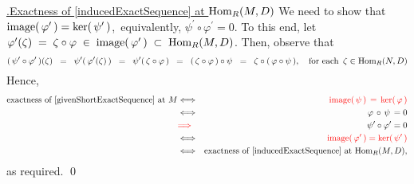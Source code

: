 \vskip 0.50cm
\noindent
\underline{{\color{white}.}Exactness of \eqref{inducedExactSequence} at $\textnormal{Hom}_{R}(M,D)$}
\vskip 0.25cm
\noindent
We need to show that \,$\textnormal{image}(\,\varphi^{\prime}\,) = \ker(\,\psi^{\prime}\,)$,\,
equivalently, $\psi^{\prime} \circ \varphi^{\prime} = 0$.
To this end, let
$\varphi^{\prime}(\zeta) \;=\; \zeta \circ \varphi \;\in\; \textnormal{image}(\,\varphi^{\prime}\,) \;\subset\; \textnormal{Hom}_{R}(M,D)$.
Then, observe that
\begin{equation*}
(\,\psi^{\prime}\circ\varphi^{\prime}\,)(\zeta)
\;\; = \;\;
	\psi^{\prime}(\,\varphi^{\prime}(\zeta)\,)
\;\; = \;\;
	\psi^{\prime}(\,\zeta \circ \varphi\,)
\;\; = \;\;
	(\,\zeta \circ \varphi\,) \circ \psi
\;\; = \;\;
	\zeta \circ (\,\varphi \circ \psi\,),
\quad
	\textnormal{for each \,$\zeta \in \textnormal{Hom}_{R}(N,D)$}
\end{equation*}
Hence,
\begin{eqnarray*}
\textnormal{exactness of \eqref{givenShortExactSequence} at $M$}
& \Longleftrightarrow &
	{\color{red}\textnormal{image}(\,\psi\,) \,=\, \ker(\,\varphi\,)}
\\
& \Longleftrightarrow &
	\varphi \,\circ\, \psi \,= 0
\\
& {\color{red}\Longrightarrow} &
	\psi^{\prime} \circ \varphi^{\prime} = 0
\\
& \Longleftrightarrow &
	{\color{red}\textnormal{image}(\,\varphi^{\prime}\,) = \ker(\,\psi^{\prime}\,)}
\\
& \Longleftrightarrow &
	\textnormal{exactness of \eqref{inducedExactSequence} at $\textnormal{Hom}_{R}(M,D)$},
\end{eqnarray*}
as required.
\qed


